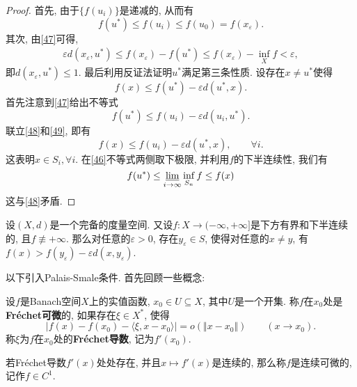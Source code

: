 \begin{theorem}[Ekeland]
\begin{proof}
        首先, 由于$\{f(u_i)\}$是递减的, 从而有 
        \begin{equation*}
            f(u^*) \leq f(u_i) \leq f(u_0) = f(x_{\varepsilon}).
        \end{equation*}
        其次, 由\eqref{47}可得, 
        \begin{align*}
            \varepsilon d(x_{\varepsilon}, u^*) \leq f(x_{\varepsilon}) - f(u^*) \leq f(x_{\varepsilon}) - \inf_Xf < \varepsilon,
        \end{align*}
        即$d(x_{\varepsilon}, u^*) \leq 1$. 最后利用反证法证明$u^*$满足第三条性质. 设存在$x \neq u^*$使得 
        \begin{equation}\label{48}
            f(x) \leq f(u^*) - \varepsilon d(u^*, x).
        \end{equation} 
        首先注意到\eqref{47}给出不等式 
        \begin{equation}\label{49}
            f(u^*) \leq f(u_i) - \varepsilon d(u_i, u^*).
        \end{equation}
        联立\eqref{48}和\eqref{49}, 即有 
        \begin{equation*}
            f(x) \leq f(u_i) - \varepsilon d(u^*, x), \qquad \forall i.
        \end{equation*}
        这表明$x \in S_i, \forall i$. 在\eqref{46}不等式两侧取下极限, 并利用$f$的下半连续性, 我们有 
        \begin{equation*}
            f(u^*) \leq \varliminf\limits_{i \rightarrow \infty}\inf_{S_n}f \leq f(x)
        \end{equation*}
        这与\eqref{48}矛盾.
    \end{proof}
\end{theorem}

\begin{corollary}
    设$(X, d)$是一个完备的度量空间. 又设$f\colon X \rightarrow (-\infty, +\infty]$是下方有界和下半连续的, 且$f \not\equiv +\infty$.
    那么对任意的$\varepsilon > 0$, 存在$y_{\varepsilon} \in S$, 使得对任意的$x \neq y$, 有$f(x) > f(y_{\varepsilon}) - \varepsilon d(x, y_{\varepsilon})$.
\end{corollary}

以下引入Palais-Smale条件. 首先回顾一些概念:

\begin{definition}
    设$f$是Banach空间$X$上的实值函数, $x_0 \in U \subseteq X$, 其中$U$是一个开集.
    称$f$在$x_0$处是\textbf{Fr\'echet可微}的, 如果存在$\xi \in X^*$, 使得 
    \begin{equation*}
        |f(x) - f(x_0) - \langle \xi, x - x_0\rangle| = o(\Vert x - x_0\Vert) \qquad (x \rightarrow x_0).
    \end{equation*}
    称$\xi$为$f$在$x_0$处的\textbf{Fr\'echet导数}, 记为$f'(x_0)$.

    若Fr\'echet导数$f'(x)$处处存在, 并且$x \mapsto f'(x)$是连续的, 那么称$f$是连续可微的, 记作$f \in C^1$.
\end{definition}

